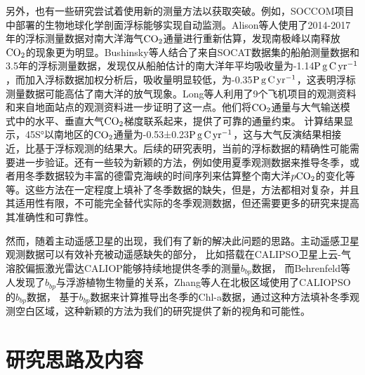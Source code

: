另外，也有一些研究尝试着使用新的测量方法以获取突破。例如，SOCCOM项目中部署的生物地球化学剖面浮标能够实现自动监测。Alison等人\cite{gray2018autonomous}使用了2014-2017年的浮标测量数据对南大洋海气$\rm CO_2$通量进行重新估算，发现南极峰以南释放$\rm CO_2$的现象更为明显。Bushinsky等人\cite{bushinsky2019reassessing}结合了来自SOCAT数据集的船舶测量数据和3.5年的浮标测量数据，发现仅从船舶估计的南大洋年平均吸收量为-1.14$\rm P \, g \, C \, yr^{-1}$，而加入浮标数据加权分析后，吸收量明显较低，为-0.35$\rm P \, g \, C \, yr^{-1}$，这表明浮标测量数据可能高估了南大洋的放气现象。Long等人\cite{long2021strong}利用了9个飞机项目的观测资料和来自地面站点的观测资料进一步证明了这一点。他们将$\rm CO_2$通量与大气输送模式中的水平、垂直大气$\rm CO_2$梯度联系起来，提供了可靠的通量约束。 计算结果显示，45S°以南地区的$\rm CO_2$通量为-0.53±0.23$\rm P\, g\, C\, yr^{-1}$，这与大气反演结果相接近，比基于浮标观测的结果大。后续的研究\cite{wu2023controversial}表明，当前的浮标数据的精确性可能需要进一步验证。还有一些较为新颖的方法，例如使用夏季观测数据来推导冬季\cite{mackay2022improved}，或者用冬季数据较为丰富的德雷克海峡的时间序列来估算整个南大洋$p\rm CO_2$的变化\cite{fay2018utilizing}等等。这些方法在一定程度上填补了冬季数据的缺失，但是，方法都相对复杂，并且其适用性有限，不可能完全替代实际的冬季观测数据，但还需要更多的研究来提高其准确性和可靠性。

然而，随着主动遥感卫星的出现，我们有了新的解决此问题的思路。主动遥感卫星观测数据可以有效补充被动遥感缺失的部分，
比如搭载在CALIPSO卫星上云-气溶胶偏振激光雷达CALIOP能够持续地提供冬季的测量$b_{bp}$数据，
而Behrenfeld等人\cite{bbp_Annual_2017}发现了$b_{bp}$与浮游植物生物量的关系，Zhang等人\cite{zhang2022carbon}在北极区域使用了CALIOPSO的$b_{bp}$数据，
基于$b_{bp}$数据来计算推导出冬季的Chl-a数据，通过这种方法填补冬季观测空白区域，这种新颖的方法为我们的研究提供了新的视角和可能性。
\section{研究思路及内容}
